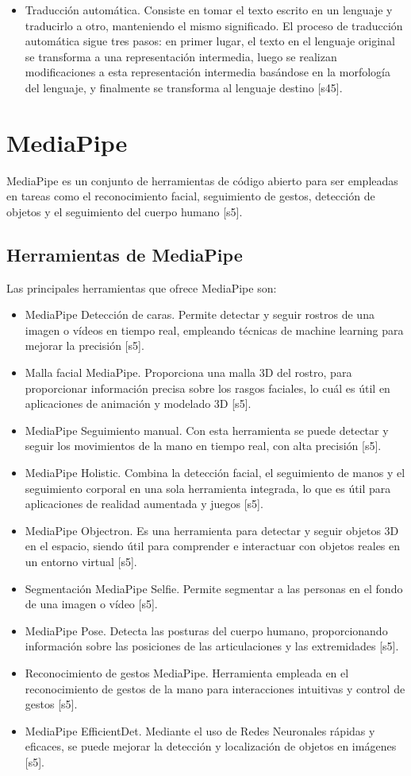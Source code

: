 \begin{itemize}
    \item Traducción automática. Consiste en tomar el texto escrito en un lenguaje y traducirlo a otro, manteniendo el mismo significado. El proceso de traducción automática sigue tres pasos: en primer lugar, el texto en el lenguaje original se transforma a una representación intermedia, luego se realizan modificaciones a esta representación intermedia basándose en la morfología del lenguaje, y finalmente se transforma al lenguaje destino [s45].

\end{itemize}

\section{MediaPipe}
MediaPipe es un conjunto de herramientas de código abierto para ser empleadas en tareas como el reconocimiento facial, seguimiento de gestos, detección de objetos y el seguimiento del cuerpo humano [s5].
\subsection{Herramientas de MediaPipe}
Las principales herramientas que ofrece MediaPipe son:
\begin{itemize}
    \item MediaPipe Detección de caras. Permite detectar y seguir rostros de una imagen o vídeos en tiempo real, empleando técnicas de machine learning para mejorar la precisión [s5].
    \item Malla facial MediaPipe. Proporciona una malla 3D del rostro, para proporcionar información precisa sobre los rasgos faciales, lo cuál es útil en aplicaciones de animación y modelado 3D [s5].
    \item MediaPipe Seguimiento manual. Con esta herramienta se puede detectar y seguir los movimientos de la mano en tiempo real, con alta precisión [s5].
    \item MediaPipe Holistic. Combina la detección facial, el seguimiento de manos y el seguimiento corporal en una sola herramienta integrada, lo que es útil para aplicaciones de realidad aumentada y juegos [s5].
    \item MediaPipe Objectron. Es una herramienta para detectar y seguir objetos 3D en el espacio, siendo útil para comprender e interactuar con objetos reales en un entorno virtual [s5].
    \item Segmentación MediaPipe Selfie. Permite segmentar a las personas en el fondo de una imagen o vídeo [s5].
    \item MediaPipe Pose. Detecta las posturas del cuerpo humano, proporcionando información sobre las posiciones de las articulaciones y las extremidades [s5].
    \item Reconocimiento de gestos MediaPipe. Herramienta empleada en el reconocimiento de gestos de la mano para interacciones intuitivas y control de gestos [s5].
    \item MediaPipe EfficientDet. Mediante el uso de Redes Neuronales rápidas y eficaces, se puede mejorar la detección y localización de objetos en imágenes [s5]. 

\end{itemize}

